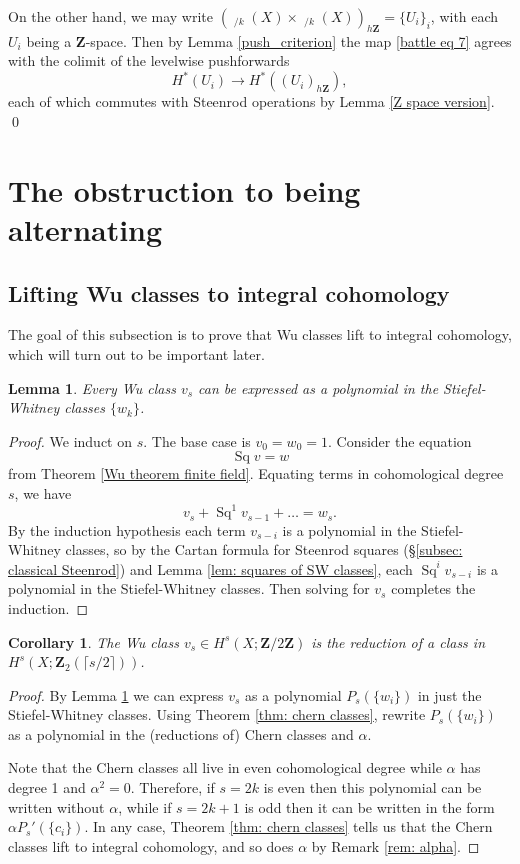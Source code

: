 \documentclass[10pt, reqno]{amsart}
\numberwithin{equation}{subsection}
\newcommand{\Z}{\mathbf{Z}}
\DeclareMathOperator{\et}{\acute{e}t}
\DeclareMathOperator{\Sq}{Sq}
\DeclareMathOperator{\Et}{\acute{E}t}
\newtheorem{lemma}[thm]{Lemma}
\newtheorem{cor}[thm]{Corollary}
\theoremstyle{remark}
\begin{document}
On the other hand, we may write $(\Et_{/k}(X) \times \Et_{/k}(X))_{h\Z} = \{U_i\}_i$, with each $U_i$ being a $\Z$-space. Then by Lemma \ref{push_criterion} the map \eqref{battle eq 7} agrees with the colimit of the levelwise pushforwards 
\[
H^*(U_i) \rightarrow  H^*((U_i)_{h\Z}),
\]
each of which commutes with Steenrod operations by Lemma \ref{Z space version}. \qed



\section{The obstruction to being alternating}\label{sec: alternating}

\subsection{Lifting Wu classes to integral cohomology}\label{subsec: lifting SW}

The goal of this subsection is to prove that Wu classes lift to integral cohomology, which will turn out to be important later.

\begin{lemma}\label{lem: wu in terms of SW}
Every Wu class $v_{s}$ can be expressed as a polynomial in the Stiefel-Whitney classes $\{w_k\}$. 
\end{lemma}

\begin{proof}
We induct on $s$. The base case is $v_0 = w_0 =1$. Consider the equation 
\[
\Sq v = w
\] 
from Theorem \ref{Wu theorem finite field}. Equating terms in cohomological degree $s$, we have 
\[
v_s + \Sq^1v_{s-1} + \ldots  = w_s.
\]
By the induction hypothesis each term $v_{s-i}$ is a polynomial in the Stiefel-Whitney classes, so by the Cartan formula for Steenrod squares (\S \ref{subsec: classical Steenrod}) and Lemma \ref{lem: squares of SW classes}, each $\Sq^i v_{s-i}$ is a polynomial in the Stiefel-Whitney classes. Then solving for $v_s$ completes the induction.
\end{proof}

\begin{cor}\label{cor: wu class lifts} The Wu class $v_{s} \in H^{s}_{\et}(X;\Z/2\Z)$ is the reduction of a class in $H^{s}_{\et}(X;\Z_2(\lceil s/2 \rceil))$.
\end{cor}

\begin{proof}
By Lemma \ref{lem: wu in terms of SW} we can express  $v_{s}$ as a polynomial $P_{s}(\{w_i\})$ in just the Stiefel-Whitney classes. Using Theorem \ref{thm: chern classes}, rewrite $P_{s}(\{w_i\})$ as a polynomial in the (reductions of) Chern classes and $\alpha$.

Note that the Chern classes all live in even cohomological degree while $\alpha$ has degree 1 and $\alpha^2 = 0$. Therefore, if $s=2k$ is even then this polynomial can be written without $\alpha$, while if $s=2k+1$ is odd then it can be written in the form $\alpha P_{s}'(\{c_i\})$. In any case, Theorem \ref{thm: chern classes} tells us that the Chern classes lift to integral cohomology, and so does $\alpha$ by Remark \ref{rem: alpha}.
\end{proof}
\end{document}
